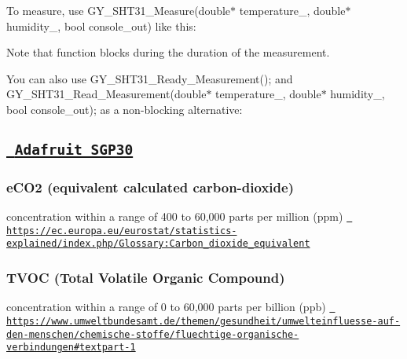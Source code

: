 To measure, use {\ttfamily G\+Y\+\_\+\+S\+H\+T31\+\_\+\+Measure(double$\ast$ temperature\+\_\+, double$\ast$ humidity\+\_\+, bool console\+\_\+out)} like this\+: 
\begin{DoxyCode}{0}
\DoxyCodeLine{}
\end{DoxyCode}


Note that function blocks during the duration of the measurement.

You can also use {\ttfamily G\+Y\+\_\+\+S\+H\+T31\+\_\+\+Ready\+\_\+\+Measurement();} and {\ttfamily G\+Y\+\_\+\+S\+H\+T31\+\_\+\+Read\+\_\+\+Measurement(double$\ast$ temperature\+\_\+, double$\ast$ humidity\+\_\+, bool console\+\_\+out);} as a non-\/blocking alternative\+: 
\begin{DoxyCode}{0}
\DoxyCodeLine{}
\end{DoxyCode}


\subsection*{\href{https://learn.adafruit.com/adafruit-sgp30-gas-tvoc-eco2-mox-sensor/}{\texttt{ Adafruit S\+G\+P30}}}

\subsubsection*{e\+C\+O2 (equivalent calculated carbon-\/dioxide)}

concentration within a range of 400 to 60,000 parts per million (ppm) \href{https://ec.europa.eu/eurostat/statistics-explained/index.php/Glossary:Carbon_dioxide_equivalent}{\texttt{ https\+://ec.\+europa.\+eu/eurostat/statistics-\/explained/index.\+php/\+Glossary\+:\+Carbon\+\_\+dioxide\+\_\+equivalent}}

\subsubsection*{T\+V\+OC (Total Volatile Organic Compound)}

concentration within a range of 0 to 60,000 parts per billion (ppb) \href{https://www.umweltbundesamt.de/themen/gesundheit/umwelteinfluesse-auf-den-menschen/chemische-stoffe/fluechtige-organische-verbindungen\#textpart-1}{\texttt{ https\+://www.\+umweltbundesamt.\+de/themen/gesundheit/umwelteinfluesse-\/auf-\/den-\/menschen/chemische-\/stoffe/fluechtige-\/organische-\/verbindungen\#textpart-\/1}} 
